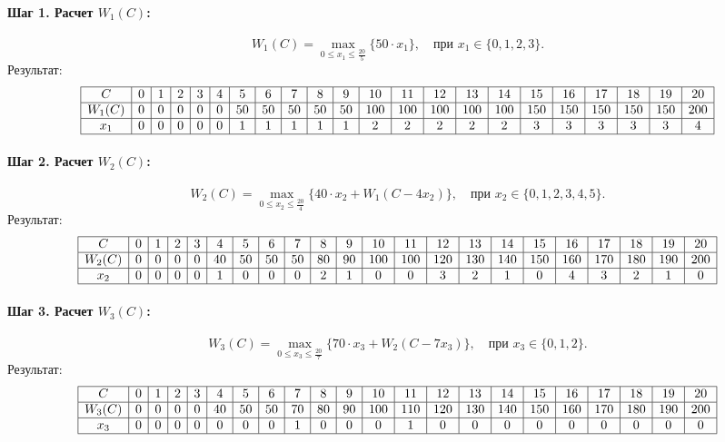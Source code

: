 \documentclass{article}
\begin{document}
\paragraph*{Шаг 1. Расчет $W_1(C)$:}
\[
    W_1(C) = \max_{0 \leq x_1 \leq \frac{20}{5}} \{ 50 \cdot x_1 \}, \quad \text{при } x_1 \in \{0, 1, 2, 3\}.
\]
Результат:
\[
    \begin{array}{|c|c|c|c|c|c|c|c|c|c|c|c|c|c|c|c|c|c|c|c|c|c|}
        \hline
        C      & 0 & 1 & 2 & 3 & 4 & 5  & 6  & 7  & 8  & 9  & 10  & 11  & 12  & 13  & 14  & 15  & 16  & 17  & 18  & 19  & 20  \\
        \hline
        W_1(C) & 0 & 0 & 0 & 0 & 0 & 50 & 50 & 50 & 50 & 50 & 100 & 100 & 100 & 100 & 100 & 150 & 150 & 150 & 150 & 150 & 200 \\
        \hline
        x_1    & 0 & 0 & 0 & 0 & 0 & 1  & 1  & 1  & 1  & 1  & 2   & 2   & 2   & 2   & 2   & 3   & 3   & 3   & 3   & 3   & 4   \\
        \hline
    \end{array}
\]

\paragraph*{Шаг 2. Расчет $W_2(C)$:}
\[
    W_2(C) = \max_{0 \leq x_2 \leq \frac{20}{4}} \{ 40 \cdot x_2 + W_1(C - 4 x_2) \}, \quad \text{при } x_2 \in \{0, 1, 2, 3, 4, 5\}.
\]
Результат:
\[
    \begin{array}{|c|c|c|c|c|c|c|c|c|c|c|c|c|c|c|c|c|c|c|c|c|c|}
        \hline
        C      & 0 & 1 & 2 & 3 & 4  & 5  & 6  & 7  & 8  & 9  & 10  & 11  & 12  & 13  & 14  & 15  & 16  & 17  & 18  & 19  & 20  \\
        \hline
        W_2(C) & 0 & 0 & 0 & 0 & 40 & 50 & 50 & 50 & 80 & 90 & 100 & 100 & 120 & 130 & 140 & 150 & 160 & 170 & 180 & 190 & 200 \\
        \hline
        x_2    & 0 & 0 & 0 & 0 & 1  & 0  & 0  & 0  & 2  & 1  & 0   & 0   & 3   & 2   & 1   & 0   & 4   & 3   & 2   & 1   & 0   \\
        \hline
    \end{array}
\]

\paragraph*{Шаг 3. Расчет $W_3(C)$:}
\[
    W_3(C) = \max_{0 \leq x_3 \leq \frac{20}{7}} \{ 70 \cdot x_3 + W_2(C - 7 x_3) \}, \quad \text{при } x_3 \in \{0, 1, 2\}.
\]
Результат:
\[
    \begin{array}{|c|c|c|c|c|c|c|c|c|c|c|c|c|c|c|c|c|c|c|c|c|c|}
        \hline
        C      & 0 & 1 & 2 & 3 & 4  & 5  & 6  & 7  & 8  & 9  & 10  & 11  & 12  & 13  & 14  & 15  & 16  & 17  & 18  & 19  & 20  \\
        \hline
        W_3(C) & 0 & 0 & 0 & 0 & 40 & 50 & 50 & 70 & 80 & 90 & 100 & 110 & 120 & 130 & 140 & 150 & 160 & 170 & 180 & 190 & 200 \\
        \hline
        x_3    & 0 & 0 & 0 & 0 & 0  & 0  & 0  & 1  & 0  & 0  & 0   & 1   & 0   & 0   & 0   & 0   & 0   & 0   & 0   & 0   & 0   \\
        \hline
    \end{array}
\]
\end{document}
